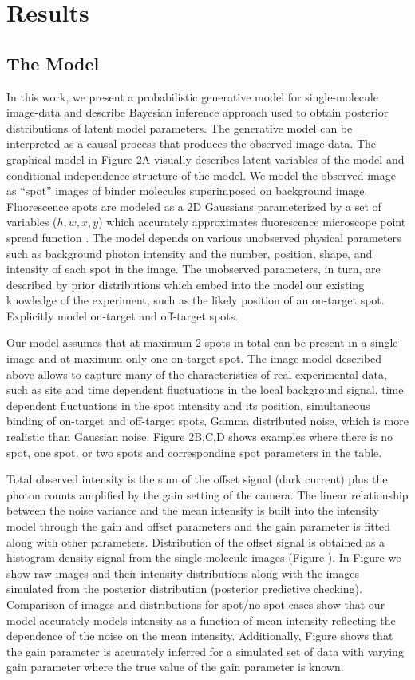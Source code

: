 \section{Results}

\subsection{The Model}

In this work, we present a probabilistic generative model for single-molecule image-data and describe Bayesian inference approach used to obtain posterior distributions of latent model parameters. The generative model can be interpreted as a causal process that produces the observed image data. The graphical model in Figure 2A visually describes latent variables of the model and conditional independence structure of the model. We model the observed image as ``spot'' images of binder molecules superimposed on background image. Fluorescence spots are modeled as a 2D Gaussians parameterized by a set of variables ($h, w, x, y$) which accurately approximates fluorescence microscope point spread function \cite{Zhang2007-rb}. The model depends on various unobserved physical parameters such as background photon intensity and the number, position, shape, and intensity of each spot in the image. The unobserved parameters, in turn, are described by prior distributions which embed into the model our existing knowledge of the experiment, such as the likely position of an on-target spot. Explicitly model on-target and off-target spots.

Our model assumes that at maximum 2 spots in total can be present in a single image and at maximum only one on-target spot. The image model described above allows to capture many of the characteristics of real experimental data, such as site and time dependent fluctuations in the local background signal, time dependent fluctuations in the spot intensity and its position, simultaneous binding of on-target and off-target spots, Gamma distributed noise, which is more realistic than Gaussian noise. Figure 2B,C,D shows examples where there is no spot, one spot, or two spots and corresponding spot parameters in the table.

Total observed intensity is the sum of the offset signal (dark current) plus the photon counts amplified by the gain setting of the camera. The linear relationship between the noise variance and the mean intensity is built into the intensity model through the gain and offset parameters and the gain parameter is fitted along with other parameters. Distribution of the offset signal is obtained as a histogram density signal from the single-molecule images (Figure ).  In Figure we show raw images and their intensity distributions along with the images simulated from the posterior distribution (posterior predictive checking). Comparison of images and distributions for spot/no spot cases show that our model accurately models intensity as a function of mean intensity reflecting the dependence of the noise on the mean intensity. Additionally, Figure shows that the gain parameter is accurately inferred for a simulated set of data with varying gain parameter where the true value of the gain parameter is known.

